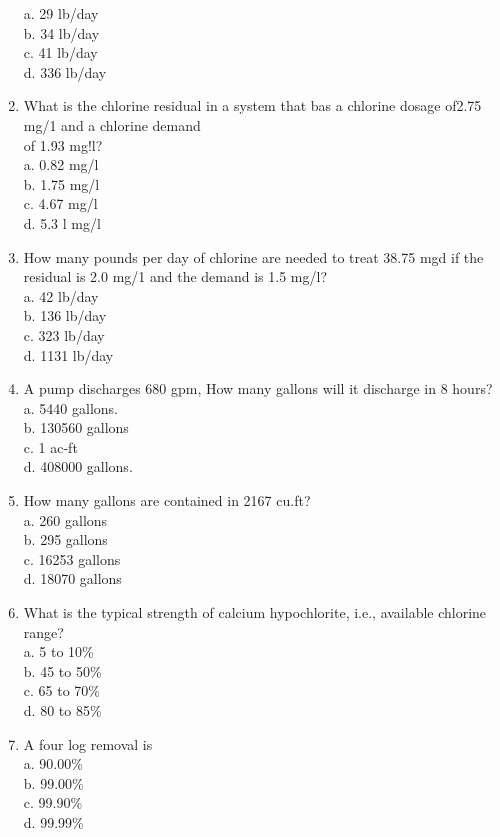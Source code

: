 \begin{enumerate}
a. 29 lb/day\\
b. 34 lb/day\\
c. 41 lb/day\\
d. 336 lb/day\\
\item What is the chlorine residual in a system that bas a chlorine dosage of2.75 mg/1 and a chlorine demand\\
of 1.93 mg!l?\\
a. 0.82 mg/l\\
b. 1.75 mg/l\\
c. 4.67 mg/l\\
d. 5.3 l mg/l\\
\item How many pounds per day of chlorine are needed to treat 38.75 mgd if the residual is 2.0 mg/1 and the demand is 1.5 mg/l?\\
a. 42 lb/day \\
b. 136 lb/day \\
c. 323 lb/day\\
d. 1131 lb/day\\
\item A pump discharges 680 gpm, How many gallons will it discharge in 8 hours?\\
a. 5440 gallons. \\
b. 130560 gallons\\
c. 1 ac-ft\\
d. 408000 gallons.\\
\item How many gallons are contained in 2167 cu.ft?\\
a. 260 gallons \\
b. 295 gallons\\
c. 16253 gallons\\
d. 18070 gallons\\
\item What is the typical strength of calcium hypochlorite, i.e., available chlorine range?\\
a. 5 to 10\%\\
b. 45 to 50\%\\
c. 65 to 70\%\\
d. 80 to 85\%\\
\item A four log removal is\\
a. 90.00\%\\
b. 99.00\%\\
c. 99.90\%\\
d. 99.99\%\\

\end{enumerate}
